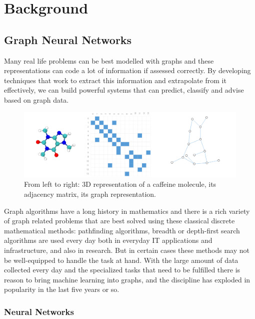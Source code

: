 \chapter{Background}

\section{Graph Neural Networks}

	Many real life problems can be best modelled with graphs and these representations can code a lot of information if assessed correctly. By developing techniques that work to extract this information and extrapolate from it effectively, we can build powerful systems that can predict, classify and advise based on graph data.
	
	\begin{figure}[!h]
		\centering
		\includegraphics[width=\textwidth]{figures/molecule.png}
		\caption{From left to right: 3D representation of a caffeine molecule, its adjacency matrix, its graph representation. \cite{sanchez-lengeling2021a}}
	\end{figure}
	
	Graph algorithms have a long history in mathematics and there is a rich variety of graph related problems that are best solved using these classical discrete mathematical methods: pathfinding algorithms, breadth or depth-first search algorithms are used every day both in everyday IT applications and infrastructure, and also in research. But in certain cases these methods may not be well-equipped to handle the task at hand. With the large amount of data collected every day and the specialized tasks that need to be fulfilled there is reason to bring machine learning into graphs, and the discipline has exploded in popularity in the last five years or so\cite{gaudelet2021utilizing}.

	\subsection{Neural Networks}
	
